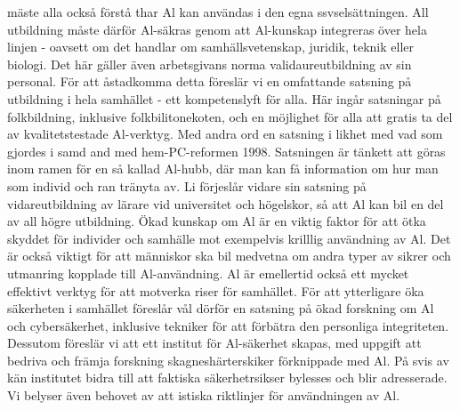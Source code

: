 {{{{{{{{{{{{{{{{{{{mäste alla också förstå thar Al kan användas i den egna ssvselsättningen. All utbildning måste därför Al-säkras genom att Al-kunskap integreras över hela linjen - oavsett om det handlar om samhällsvetenskap, juridik, teknik eller biologi. Det här gäller även arbetsgivans norma validaureutbildning av sin personal.
För att åstadkomma detta föreslär vi en omfattande satsning på utbildning i hela samhället - ett kompetenslyft för alla. Här ingår satsningar på folkbildning, inklusive folkbilitonekoten, och en möjlighet för alla att gratis ta del av kvalitetstestade Al-verktyg. Med andra ord en satsning i likhet med vad som gjordes i samd and med hem-PC-reformen 1998. Satsningen är tänkett att göras inom ramen för en så kallad Al-hubb, där man kan få information om hur man som individ och ran tränyta av. Li förjeslår vidare sin satsning på vidareutbildning av lärare vid universitet och högelskor, så att Al kan bil en del av all högre utbildning.
Ökad kunskap om Al är en viktig faktor för att ötka skyddet för individer och samhälle mot exempelvis krilllig användning av Al. Det är också viktigt för att människor ska bil medvetna om andra typer av sikrer och utmanring kopplade till Al-användning. Al är emellertid också ett mycket effektivt verktyg för att motverka riser för samhället. För att ytterligare öka säkerheten i samhället föreslår vål dörför en satsning på ökad forskning om Al och cybersäkerhet, inklusive tekniker för att förbätra den personliga integriteten. Dessutom föreslär vi att ett institut för Al-säkerhet skapas, med uppgift att bedriva och främja forskning skagneshärterskiker förknippade med Al. På svis av kän institutet bidra till att faktiska säkerhetrsikser bylesses och blir adresserade. Vi belyser även behovet av att istiska riktlinjer för användningen av Al.
}}}}}}}}}}}}}}}}}}}
